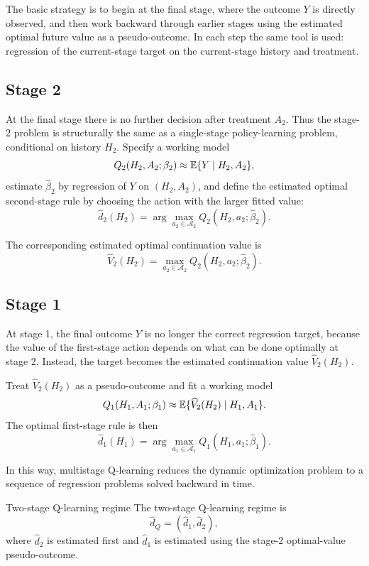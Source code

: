 \documentclass[master.tex]{subfiles}
\begin{document}
The basic strategy is to begin at the final stage, where the outcome $Y$ is directly observed, and then work backward through earlier stages using the estimated optimal future value as a pseudo-outcome. In each step the same tool is used: regression of the current-stage target on the current-stage history and treatment.

\subsection{Stage 2}

At the final stage there is no further decision after treatment $A_2$. Thus the stage-2 problem is structurally the same as a single-stage policy-learning problem, conditional on history $H_2$. Specify a working model
\[
Q_2(H_2,A_2;\beta_2)\approx \mathbb{E}\{Y\mid H_2,A_2\},
\]
estimate $\hat\beta_2$ by regression of $Y$ on $(H_2, A_2)$, and define the estimated optimal second-stage rule by choosing the action with the larger fitted value:
\[
\hat d_2(H_2)=\arg\max_{a_2\in\mathcal A_2} Q_2(H_2,a_2;\hat\beta_2).
\]

The corresponding estimated optimal continuation value is
\[
\widehat V_2(H_2)=\max_{a_2\in\mathcal A_2} Q_2(H_2,a_2;\hat\beta_2).
\]

\subsection{Stage 1}

At stage 1, the final outcome $Y$ is no longer the correct regression target, because the value of the first-stage action depends on what can be done optimally at stage 2. Instead, the target becomes the estimated continuation value $\widehat V_2(H_2)$.

Treat $\widehat V_2(H_2)$ as a pseudo-outcome and fit a working model
\[
Q_1(H_1,A_1;\beta_1)\approx \mathbb{E}\{\widehat V_2(H_2)\mid H_1,A_1\}.
\]
The optimal first-stage rule is then
\[
\hat d_1(H_1)=\arg\max_{a_1\in\mathcal A_1} Q_1(H_1,a_1;\hat\beta_1).
\]

In this way, multistage Q-learning reduces the dynamic optimization problem to a sequence of regression problems solved backward in time.

\begin{defn}{Two-stage Q-learning regime}
\label{w15:defn:qlearn-regime}
The two-stage Q-learning regime is
\[
\hat d_Q=(\hat d_1,\hat d_2),
\]
where \(\hat d_2\) is estimated first and \(\hat d_1\) is estimated using the stage-2 optimal-value pseudo-outcome.
\end{defn}
\end{document}
